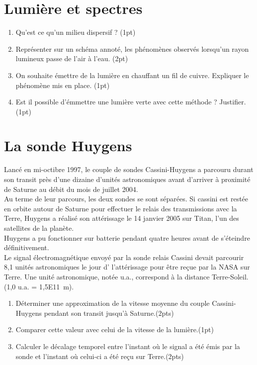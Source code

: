 \documentclass[a4paper,11pt,fleqn]{article}%
\begin{document}
\maketitle

\section{Lumière et spectres}
\begin{enumerate}
	\item Qu'est ce qu'un milieu dispersif ? (1pt)
	\item Représenter sur un schéma annoté, les phénomènes observés lorsqu'un rayon lumineux passe de l'air à l'eau. (2pt)
	\item On souhaite émettre de la lumière en chauffant un fil de cuivre. Expliquer le phénomène mis en place. (1pt)
	\item Est il possible d'émmettre une lumière verte avec cette méthode ? Justifier. (1pt)
\end{enumerate}

\section{La sonde Huygens}
Lancé en mi-octibre 1997, le couple de sondes Cassini-Huygens a parcouru durant son transit près d'une dizaine d'unités astronomiques avant d'arriver à proximité de Saturne au débit du mois de juillet 2004.\\
Au terme de leur parcours, les deux sondes se sont séparées. Si cassini est restée en orbite autour de Saturne pour effectuer le relais des transmissions avec la Terre, Huygens a réalisé son attérissage le 14 janvier 2005 sur Titan, l'un des satellites de la planète.\\
Huygens a pu fonctionner sur batterie pendant quatre heures avant de s'éteindre définitivement.\\
Le signal électromagnétique envoyé par la sonde relais Cassini devait parcourir 8,1 unités astronomiques le jour d' l'attérissage pour être reçue par la NASA sur Terre. Une unité astronomique, notée u.a., correspond à la distance Terre-Soleil. (1,0 u.a. = \SI{1,5E11}{m}).
\begin{enumerate}
	\item Déterminer une approximation de la vitesse moyenne du couple Cassini-Huygens pendant son transit jusqu'à Saturne.(2pts)
	\item Comparer cette valeur avec celui de la vitesse de la lumière.(1pt)
	\item Calculer le décalage temporel entre l'instant où le signal a été émis par la sonde et l'instant où celui-ci a été reçu sur Terre.(2pts)
\end{enumerate}
\end{document}
